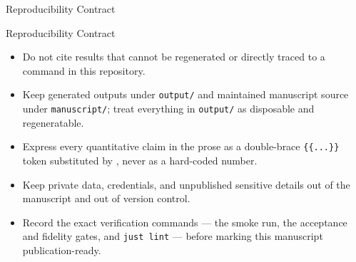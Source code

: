 \documentclass[
  ignorenonframetext,
]{beamer}
\providecommand{\tightlist}{%
  \setlength{\itemsep}{0pt}\setlength{\parskip}{0pt}}
\begin{document}
\begin{frame}{Reproducibility Contract}
\protect{}\label{reproducibility-contract}
\end{frame}

\begin{frame}{Reproducibility Contract}
\begin{itemize}
\tightlist
\item
  Do not cite results that cannot be regenerated or directly traced to a
  command in this repository.
\item
  Keep generated outputs under \texttt{output/} and maintained
  manuscript source under \texttt{manuscript/}; treat everything in
  \texttt{output/} as disposable and regeneratable.
\item
  Express every quantitative claim in the prose as a double-brace
  \texttt{\{\{...\}\}} token substituted by
  , never as a
  hard-coded number.
\item
  Keep private data, credentials, and unpublished sensitive details out
  of the manuscript and out of version control.
\item
  Record the exact verification commands --- the smoke run, the
  acceptance and fidelity gates, and \texttt{just\ lint} --- before
  marking this manuscript publication-ready.
\end{itemize}
\end{frame}
\end{document}
